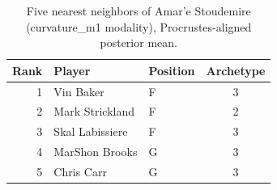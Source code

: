 \begin{table}[htbp]
  \centering\small
  \begin{tabular}{rllc}
    \toprule
    Rank & Player & Position & Archetype \\
    \midrule
    1 & Vin Baker & F & 3 \\
    2 & Mark Strickland & F & 2 \\
    3 & Skal Labissiere & F & 3 \\
    4 & MarShon Brooks & G & 3 \\
    5 & Chris Carr & G & 3 \\
    \bottomrule
  \end{tabular}
  \caption{Five nearest neighbors of Amar'e Stoudemire (curvature_m1 modality), Procrustes-aligned posterior mean.}
  \label{tab:Amar_e_Stoudemire_neighbors_curvature_m1}
\end{table}

